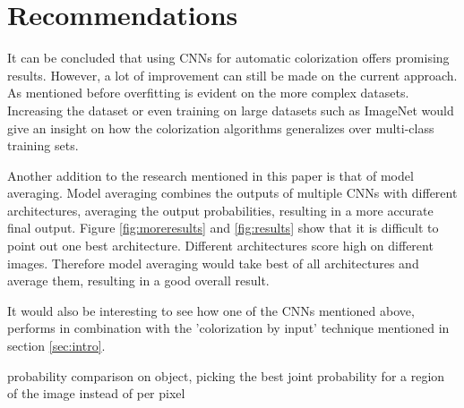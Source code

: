 \section{Recommendations}


It can be concluded that using CNNs for automatic colorization offers promising results. However, a lot of improvement can still be made on the current approach. As mentioned before overfitting is evident on the more complex datasets. Increasing the dataset or even training on large datasets such as ImageNet \cite{deng2009imagenet} would give an insight on how the colorization algorithms generalizes over multi-class training sets. 

Another addition to the research mentioned in this paper is that of model averaging. Model averaging combines the outputs of multiple CNNs with different architectures, averaging the output probabilities, resulting in a more accurate final output. Figure \ref{fig:moreresults} and \ref{fig:results} show that it is difficult to point out one best architecture. Different architectures score high on different images. Therefore model averaging would take best of all architectures and average them, resulting in a good overall result.

It would also be interesting to see how one of the CNNs mentioned above, performs in combination with the 'colorization by input' technique mentioned in section \ref{sec:intro}.


{\color{red} probability comparison on object, picking the best joint probability for a region of the image instead of per pixel}